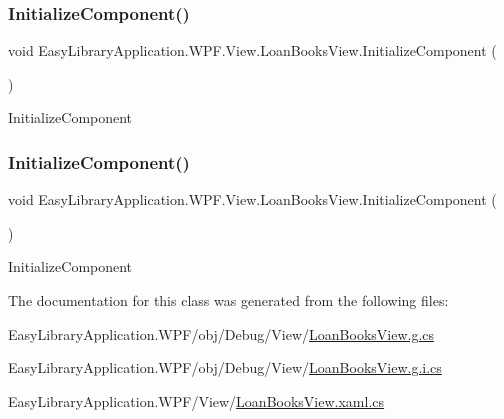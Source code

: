 \subsubsection{\texorpdfstring{Initialize\+Component()}{InitializeComponent()}\hspace{0.1cm}{\footnotesize\ttfamily [1/2]}}
{\footnotesize\ttfamily void Easy\+Library\+Application.\+W\+P\+F.\+View.\+Loan\+Books\+View.\+Initialize\+Component (\begin{DoxyParamCaption}{ }\end{DoxyParamCaption})}



Initialize\+Component 

\mbox{\label{class_easy_library_application_1_1_w_p_f_1_1_view_1_1_loan_books_view_a357ad1df4fc512de3f3e7490b2775d81}} 
\subsubsection{\texorpdfstring{Initialize\+Component()}{InitializeComponent()}\hspace{0.1cm}{\footnotesize\ttfamily [2/2]}}
{\footnotesize\ttfamily void Easy\+Library\+Application.\+W\+P\+F.\+View.\+Loan\+Books\+View.\+Initialize\+Component (\begin{DoxyParamCaption}{ }\end{DoxyParamCaption})}



Initialize\+Component 



The documentation for this class was generated from the following files\+:\begin{DoxyCompactItemize}
\item 
Easy\+Library\+Application.\+W\+P\+F/obj/\+Debug/\+View/\mbox{\hyperlink{_loan_books_view_8g_8cs}{Loan\+Books\+View.\+g.\+cs}}\item 
Easy\+Library\+Application.\+W\+P\+F/obj/\+Debug/\+View/\mbox{\hyperlink{_loan_books_view_8g_8i_8cs}{Loan\+Books\+View.\+g.\+i.\+cs}}\item 
Easy\+Library\+Application.\+W\+P\+F/\+View/\mbox{\hyperlink{_loan_books_view_8xaml_8cs}{Loan\+Books\+View.\+xaml.\+cs}}\end{DoxyCompactItemize}
